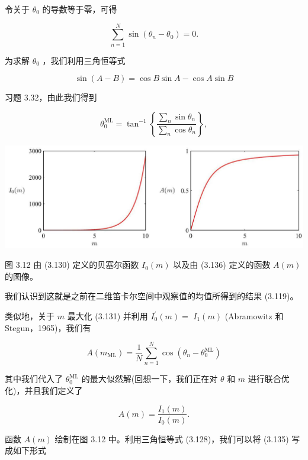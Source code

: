 \documentclass[10pt]{report}
\begin{document}
令关于 \({\theta }_{0}\) 的导数等于零，可得

\[
\mathop{\sum }\limits_{{n = 1}}^{N}\sin \left( {{\theta }_{n} - {\theta }_{0}}\right)  = 0. \tag{3.132}
\]

为求解 \({\theta }_{0}\) ，我们利用三角恒等式

\[
\sin \left( {A - B}\right)  = \cos B\sin A - \cos A\sin B \tag{3.133}
\]

习题 3.32，由此我们得到

\[
{\theta }_{0}^{\mathrm{{ML}}} = {\tan }^{-1}\left\{  \frac{\mathop{\sum }\limits_{n}\sin {\theta }_{n}}{\mathop{\sum }\limits_{n}\cos {\theta }_{n}}\right\}  , \tag{3.134}
\]

\begin{center}
\includegraphics[max width=1.0\textwidth]{images/0194e279-9b28-703a-88f4-c3ac21e2010d_112_216_360_1302_449_0.jpg}
\end{center}
\hspace*{3em} 

图 3.12 由 (3.130) 定义的贝塞尔函数 \({I}_{0}\left( m\right)\) 以及由 (3.136) 定义的函数 \(A\left( m\right)\) 的图像。

我们认识到这就是之前在二维笛卡尔空间中观察值的均值所得到的结果 (3.119)。

类似地，关于 \(m\) 最大化 (3.131) 并利用 \({I}_{0}^{\prime }\left( m\right)  =\)  \({I}_{1}\left( m\right)\) (Abramowitz 和 Stegun，1965)，我们有

\[
A\left( {m}_{\mathrm{{ML}}}\right)  = \frac{1}{N}\mathop{\sum }\limits_{{n = 1}}^{N}\cos \left( {{\theta }_{n} - {\theta }_{0}^{\mathrm{{ML}}}}\right)  \tag{3.135}
\]

其中我们代入了 \({\theta }_{0}^{\mathrm{{ML}}}\) 的最大似然解(回想一下，我们正在对 \(\theta\) 和 \(m\) 进行联合优化)，并且我们定义了

\[
A\left( m\right)  = \frac{{I}_{1}\left( m\right) }{{I}_{0}\left( m\right) }. \tag{3.136}
\]

函数 \(A\left( m\right)\) 绘制在图 3.12 中。利用三角恒等式 (3.128)，我们可以将 (3.135) 写成如下形式
\end{document}
